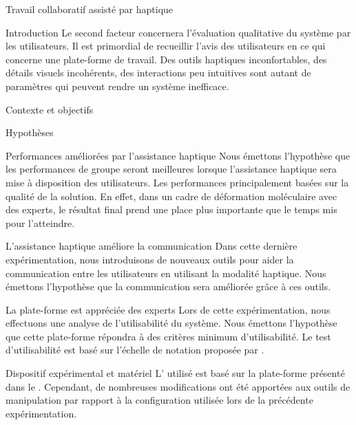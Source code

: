 \documentclass[myfrancais]{mythesis}
\begin{document}
\begin{mychapter}{Travail collaboratif assisté par haptique}
\begin{mysection}{Introduction}
			Le second facteur concernera l'évaluation qualitative du système par les utilisateurs.
			Il est primordial de recueillir l'avis des utilisateurs en ce qui concerne une plate-forme de travail.
			Des outils haptiques inconfortables, des détails visuels incohérents, des interactions peu intuitives sont autant de paramètres qui peuvent rendre un système inefficace.
		\end{mysection}
		\begin{mysection}{Contexte et objectifs}
			\begin{mysubsection}{Hypothèses}
				\begin{myparagraph}{ Performances améliorées par l'assistance haptique}
					Nous émettons l'hypothèse que les performances de groupe seront meilleures lorsque l'assistance haptique sera mise à disposition des utilisateurs.
					Les performances principalement basées sur la qualité de la solution.
					En effet, dans un cadre de déformation moléculaire avec des experts, le résultat final prend une place plus importante que le temps mis pour l'atteindre.
				\end{myparagraph}
				\begin{myparagraph}{ L'assistance haptique améliore la communication}
					Dans cette dernière expérimentation, nous introduisons de nouveaux outils pour aider la communication entre les utilisateurs en utilisant la modalité haptique.
					Nous émettons l'hypothèse que la communication sera améliorée grâce à ces outils.
				\end{myparagraph}
				\begin{myparagraph}{ La plate-forme est appréciée des experts}
					Lors de cette expérimentation, nous effectuons une analyse de l'utilisabilité du système.
					Nous émettons l'hypothèse que cette plate-forme répondra à des critères minimum d'utilisabilité.
					Le test d'utilisabilité est basé sur l'échelle de notation proposée par .
				\end{myparagraph}
			\end{mysubsection}
		\end{mysection}
		\begin{mysection}{Dispositif expérimental et matériel}
			L' utilisé est basé sur la plate-forme \myShaddock présenté dans le .
			Cependant, de nombreuses modifications ont été apportées aux outils de manipulation par rapport à la configuration utilisée lors de la précédente expérimentation.


\end{mysection}
\end{mychapter}
\end{document}
